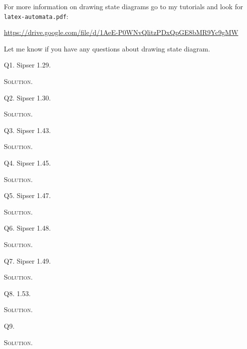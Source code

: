 For more information on drawing state diagrams go to my tutorials and
look for \verb!latex-automata.pdf!:
\begin{center}
{\small \url{https://drive.google.com/file/d/1AeE-P0WNvQlitzPDxQpGE8bMR9Yc9gMW}}
\end{center}
Let me know if you have any questions about drawing state diagram.

\newpage
Q1. Sipser 1.29.

\textsc{Solution}.



\newpage
Q2. Sipser 1.30.

\textsc{Solution}.



\newpage
Q3. Sipser 1.43.

\textsc{Solution}.



\newpage
Q4. Sipser 1.45.

\textsc{Solution}.



\newpage
Q5. Sipser 1.47.

\textsc{Solution}.



\newpage
Q6. Sipser 1.48.

\textsc{Solution}.



\newpage
Q7. Sipser 1.49.

\textsc{Solution}.



\newpage
Q8. 1.53.

\textsc{Solution}.



\newpage
Q9. 

\textsc{Solution}.




